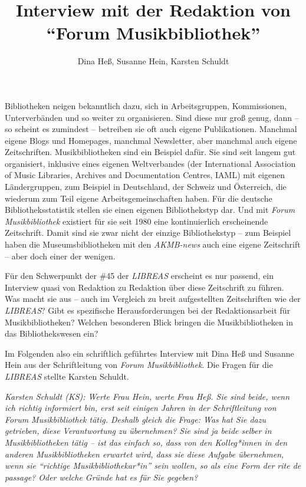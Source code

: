 \documentclass[a4paper,
fontsize=11pt,
oneside,
numbers=noperiodatend,
parskip=half-,
bibliography=totoc,
final
]{scrartcl}
\title{\LARGE{Interview mit der Redaktion von \enquote{Forum Musikbibliothek}}}%
\author{Dina Heß, Susanne Hein, Karsten Schuldt} %
\date{}
\begin{document}
\maketitle
\thispagestyle{fancyplain} 


Bibliotheken neigen bekanntlich dazu, sich in Arbeitsgruppen,
Kommissionen, Unterverbänden und so weiter zu organisieren. Sind diese
nur groß genug, dann -- so scheint es zumindest -- betreiben sie oft
auch eigene Publikationen. Manchmal eigene Blogs und Homepages, manchmal
Newsletter, aber manchmal auch eigene Zeitschriften. Musikbibliotheken
sind ein Beispiel dafür. Sie sind seit langem gut organisiert, inklusive
eines eigenen Weltverbandes (der International Association of Music
Libraries, Archives and Documentation Centres, IAML) mit eigenen
Ländergruppen, zum Beispiel in Deutschland, der Schweiz und Österreich,
die wiederum zum Teil eigene Arbeitsgemeinschaften haben. Für die
deutsche Bibliotheksstatistik stellen sie einen eigenen Bibliothekstyp
dar. Und mit \emph{Forum Musikbibliothek} existiert für sie seit 1980
eine kontinuierlich erscheinende Zeitschrift. Damit sind sie zwar nicht
der einzige Bibliothekstyp -- zum Beispiel haben die Museumsbibliotheken
mit den \emph{AKMB-news} auch eine eigene Zeitschrift -- aber doch einer
der wenigen.

Für den Schwerpunkt der \#45 der \emph{LIBREAS} erscheint es nur
passend, ein Interview quasi von Redaktion zu Redaktion über diese
Zeitschrift zu führen. Was macht sie aus -- auch im Vergleich zu breit
aufgestellten Zeitschriften wie der \emph{LIBREAS}? Gibt es spezifische
Herausforderungen bei der Redaktionsarbeit für Musikbibliotheken?
Welchen besonderen Blick bringen die Musikbibliotheken in das
Bibliothekswesen ein?

Im Folgenden also ein schriftlich geführtes Interview mit Dina Heß und
Susanne Hein aus der Schriftleitung von \emph{Forum Musikbibliothek}.
Die Fragen für die \emph{LIBREAS} stellte Karsten Schuldt.

\emph{Karsten Schuldt (KS): Werte Frau Hein, werte Frau Heß. Sie sind
beide, wenn ich richtig informiert bin, erst seit einigen Jahren in der
Schriftleitung von Forum Musikbibliothek tätig. Deshalb gleich die
Frage: Was hat Sie dazu getrieben, diese Verantwortung zu übernehmen?
Sie sind ja beide selber in Musikbibliotheken tätig -- ist das einfach
so, dass von den Kolleg*innen in den anderen Musikbibliotheken erwartet
wird, dass sie diese Aufgabe übernehmen, wenn sie \enquote{richtige
Musikbibliothekar*in} sein wollen, so als eine Form der rite de passage?
Oder welche Gründe hat es für Sie gegeben?}
\end{document}
